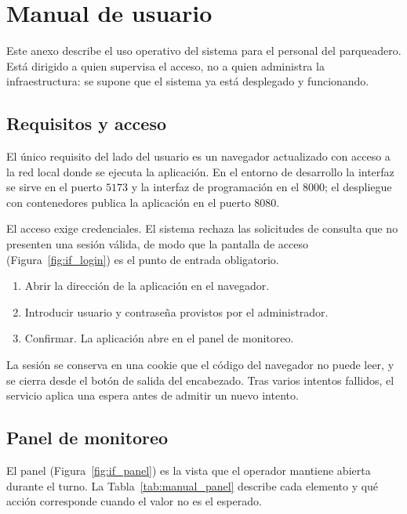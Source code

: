 \chapter{Manual de usuario}

Este anexo describe el uso operativo del sistema para el personal del
parqueadero. Está dirigido a quien supervisa el acceso, no a quien administra la
infraestructura: se supone que el sistema ya está desplegado y funcionando.

\section{Requisitos y acceso}

El único requisito del lado del usuario es un navegador actualizado con acceso a
la red local donde se ejecuta la aplicación. En el entorno de desarrollo la
interfaz se sirve en el puerto $5173$ y la interfaz de programación en el $8000$;
el despliegue con contenedores publica la aplicación en el puerto $8080$.

El acceso exige credenciales. El sistema rechaza las solicitudes de consulta que
no presenten una sesión válida, de modo que la pantalla de acceso
(Figura~\ref{fig:if_login}) es el punto de entrada obligatorio.

\begin{enumerate}
    \item Abrir la dirección de la aplicación en el navegador.
    \item Introducir usuario y contraseña provistos por el administrador.
    \item Confirmar. La aplicación abre en el panel de monitoreo.
\end{enumerate}

La sesión se conserva en una cookie que el código del navegador no puede leer, y
se cierra desde el botón de salida del encabezado. Tras varios intentos fallidos,
el servicio aplica una espera antes de admitir un nuevo intento.

\section{Panel de monitoreo}

El panel (Figura~\ref{fig:if_panel}) es la vista que el operador mantiene abierta
durante el turno. La Tabla~\ref{tab:manual_panel} describe cada elemento y qué
acción corresponde cuando el valor no es el esperado.

